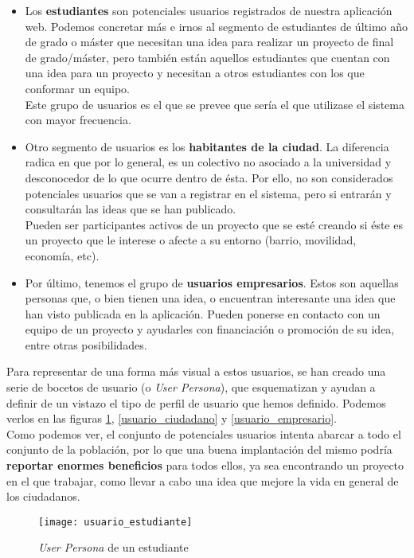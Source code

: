 \begin{itemize}
    \item Los \textbf{estudiantes} son potenciales usuarios registrados de nuestra aplicación web. Podemos concretar más e irnos al segmento de estudiantes de último año de grado o máster que necesitan una idea para realizar un proyecto de final de grado/máster, pero también están aquellos estudiantes que cuentan con una idea para un proyecto y necesitan a otros estudiantes con los que conformar un equipo.\\
    Este grupo de usuarios es el que se prevee que sería el que utilizase el sistema con mayor frecuencia.
    \item Otro segmento de usuarios es los \textbf{habitantes de la ciudad}. La diferencia radica en que por lo general, es un colectivo no asociado a la universidad y desconocedor de lo que ocurre dentro de ésta. Por ello, no son considerados potenciales usuarios que se van a registrar en el sistema, pero si entrarán y consultarán las ideas que se han publicado.\\
    Pueden ser participantes activos de un proyecto que se esté creando si éste es un proyecto que le interese o afecte a su entorno (barrio, movilidad, economía, etc).
    \item Por último, tenemos el grupo de \textbf{usuarios empresarios}. Estos son aquellas personas que, o bien tienen una idea, o encuentran interesante una idea que han visto publicada en la aplicación. Pueden ponerse en contacto con un equipo de un proyecto y ayudarles con financiación o promoción de su idea, entre otras posibilidades.
\end{itemize}

Para representar de una forma más visual a estos usuarios, se han creado una serie de bocetos de usuario (o \textit{User Persona}), que esquematizan y ayudan a definir de un vistazo el tipo de perfil de usuario que hemos definido. Podemos verlos en las figuras \ref{usuario_estudiante}, \ref{usuario_ciudadano} y \ref{usuario_empresario}.\\

Como podemos ver, el conjunto de potenciales usuarios intenta abarcar a todo el conjunto de la población, por lo que una buena implantación del mismo podría \textbf{reportar enormes beneficios} para todos ellos, ya sea encontrando un proyecto en el que trabajar, como llevar a cabo una idea que mejore la vida en general de los ciudadanos.

\begin{figure}
    \centering
    \texttt{[image: usuario\_estudiante]}
    \caption{\textit{User Persona} de un estudiante}
    \label{usuario_estudiante}
\end{figure}

